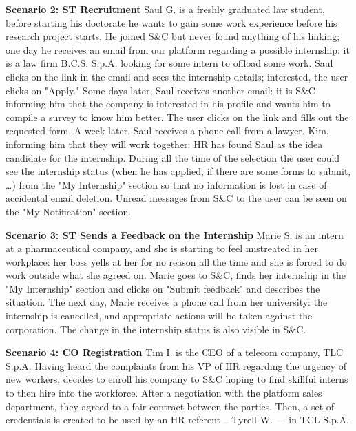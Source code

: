 \par{\textbf{Scenario 2: ST Recruitment}} Saul G. is a freshly graduated law student, before starting his doctorate
he wants to gain some work experience before his research project starts. He joined S\&C but never found anything of his
linking; one day he receives an email from our platform regarding a possible internship: it is a law firm B.C.S. S.p.A.
looking for some intern to offload some work. Saul clicks on the link in the email and sees the internship details;
interested, the user clicks on "Apply." Some days later, Saul receives another email: it is S\&C informing him that the
company is interested in his profile and wants him to compile a survey to know him better. The user clicks on the link
and fills out the requested form. A week later, Saul receives a phone call from a lawyer, Kim, informing him that they
will work together: HR has found Saul as the idea candidate for the internship. During all the time of the selection
the user could see the internship status (when he has applied, if there are some forms to submit, …) from the
"My Internship" section so that no information is lost in case of accidental email deletion. Unread messages from S\&C
to the user can be seen on the "My Notification" section.

\par{\textbf{Scenario 3: ST Sends a Feedback on the Internship}} Marie S. is an intern at a pharmaceutical company,
and she is starting to feel mistreated in her workplace: her boss yells at her for no reason all the time and she is
forced to do work outside what she agreed on. Marie goes to S\&C, finds her internship in the "My Internship" section
and clicks on "Submit feedback" and describes the situation. The next day, Marie receives a phone call from her
university: the internship is cancelled, and appropriate actions will be taken against the corporation. The change in
the internship status is also visible in S\&C.

\par{\textbf{Scenario 4: CO Registration}} Tim I. is the CEO of a telecom company, TLC S.p.A. Having heard the
complaints from his VP of HR regarding the urgency of new workers, decides to enroll his company to S\&C hoping to find
skillful interns to then hire into the workforce. After a negotiation with the platform sales department, they agreed
to a fair contract between the parties. Then, a set of credentials is created to be used by an HR referent
– Tyrell W. — in TCL S.p.A.


